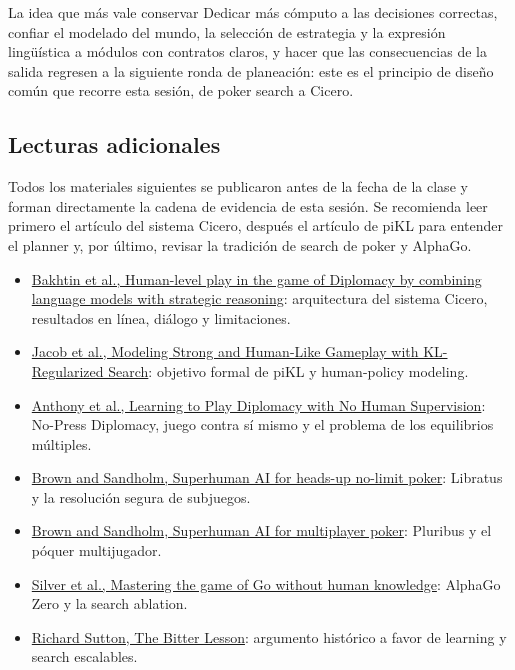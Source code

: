 \documentclass[a4paper]{article}
\begin{document}
\begin{importantbox}{La idea que más vale conservar}
Dedicar más cómputo a las decisiones correctas, confiar el modelado del mundo, la selección de estrategia y la expresión lingüística a módulos con contratos claros, y hacer que las consecuencias de la salida regresen a la siguiente ronda de planeación: este es el principio de diseño común que recorre esta sesión, de poker search a Cicero.
\end{importantbox}

\subsection{Lecturas adicionales}

Todos los materiales siguientes se publicaron antes de la fecha de la clase y forman directamente la cadena de evidencia de esta sesión. Se recomienda leer primero el artículo del sistema Cicero, después el artículo de piKL para entender el planner y, por último, revisar la tradición de search de poker y AlphaGo.

\begin{itemize}
  \item \href{https://www.science.org/doi/full/10.1126/science.ade9097}{Bakhtin et al., Human-level play in the game of Diplomacy by combining language models with strategic reasoning}: arquitectura del sistema Cicero, resultados en línea, diálogo y limitaciones.
  \item \href{https://proceedings.mlr.press/v162/jacob22a.html}{Jacob et al., Modeling Strong and Human-Like Gameplay with KL-Regularized Search}: objetivo formal de piKL y human-policy modeling.
  \item \href{https://proceedings.neurips.cc/paper/2021/hash/95f2b84de5660ddf45c8a34933a2e66f-Abstract.html}{Anthony et al., Learning to Play Diplomacy with No Human Supervision}: No-Press Diplomacy, juego contra sí mismo y el problema de los equilibrios múltiples.
  \item \href{https://www.science.org/doi/10.1126/science.aao1733}{Brown and Sandholm, Superhuman AI for heads-up no-limit poker}: Libratus y la resolución segura de subjuegos.
  \item \href{https://www.science.org/doi/10.1126/science.aay2400}{Brown and Sandholm, Superhuman AI for multiplayer poker}: Pluribus y el póquer multijugador.
  \item \href{https://www.science.org/doi/10.1126/science.aar6404}{Silver et al., Mastering the game of Go without human knowledge}: AlphaGo Zero y la search ablation.
  \item \href{http://www.incompleteideas.net/IncIdeas/BitterLesson.html}{Richard Sutton, The Bitter Lesson}: argumento histórico a favor de learning y search escalables.
\end{itemize}
\end{document}
